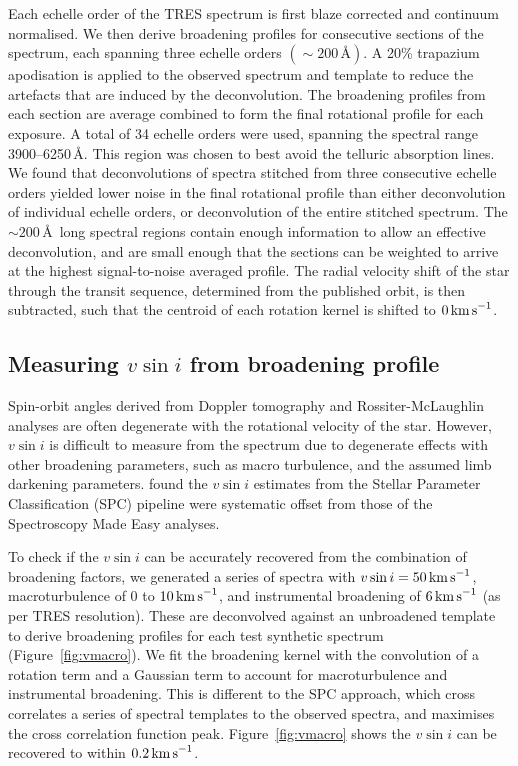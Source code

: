 \documentclass[useAMS,usenatbib]{mn2e}
\begin{document}
Each echelle order of the TRES spectrum is first blaze corrected and continuum normalised. We then derive broadening profiles for consecutive sections of the spectrum, each spanning three echelle orders $(\sim 200\,\text{\AA})$. A 20\% trapazium apodisation is applied to the observed spectrum and template to reduce the artefacts that are induced by the deconvolution. The broadening profiles from each section are average combined to form the final rotational profile for each exposure. A total of 34 echelle orders were used, spanning the spectral range 3900--6250\,\AA. This region was chosen to best avoid the telluric absorption lines. We found that deconvolutions of spectra stitched from three consecutive echelle orders yielded lower noise in the final rotational profile than either deconvolution of individual echelle orders, or deconvolution of the entire stitched spectrum. The $\sim 200\,$\AA\, long spectral regions contain enough information to allow an effective deconvolution, and are small enough that the sections can be weighted to arrive at the highest signal-to-noise averaged profile. The radial velocity shift of the star through the transit sequence, determined from the published orbit, is then subtracted, such that the centroid of each rotation kernel is shifted to $0\,\text{km\,s}^{-1}$.

\subsection{Measuring $v\sin i$ from broadening profile}

Spin-orbit angles derived from Doppler tomography and Rossiter-McLaughlin analyses are often degenerate with the rotational velocity of the star. However, $v \sin i$ is difficult to measure from the spectrum due to degenerate effects with other broadening parameters, such as macro turbulence, and the assumed limb darkening parameters. \citet{2012ApJ...757..161T} found the $v\sin i$ estimates from the Stellar Parameter Classification (SPC) pipeline \citep[used in the discovery papers, []{2012Natur.486..375B} were systematic offset from those of the Spectroscopy Made Easy \citep[SME][]{1996A&amp;AS..118..595V} analyses. 

To check if the $v\sin i$ can be accurately recovered from the combination of broadening factors, we generated a series of spectra with $v\sin i=50\,\text{km\,s}^{-1}$, macroturbulence of 0 to $10\,\text{km\,s}^{-1}$, and instrumental broadening of $6\,\text{km\,s}^{-1}$ (as per TRES resolution). These are deconvolved against an unbroadened template to derive broadening profiles for each test synthetic spectrum (Figure~\ref{fig:vmacro}). We fit the broadening kernel with the convolution of a rotation term \citep[modelled analytically from][]{2005oasp.book.....G} and a Gaussian term to account for macroturbulence \citep[Expected for F-stars at $6500\,\text{K}$ to be $\sim 6\,\text{km\,s}^{-1}$][]{2014MNRAS.444.3592D} and instrumental broadening. This is different to the SPC approach, which cross correlates a series of spectral templates to the observed spectra, and maximises the cross correlation function peak. Figure~\ref{fig:vmacro} shows the $v\sin i$ can be recovered to within $0.2\,\text{km\,s}^{-1}$. 
\end{document}
